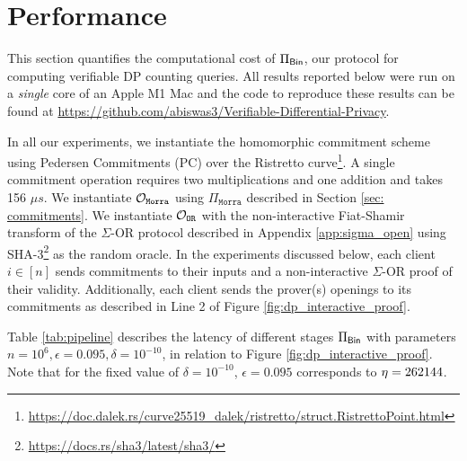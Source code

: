 \section{Performance}
\label{sec:expts}

This section quantifies the computational cost of $\Pi_{\mathsf{Bin}}$, our protocol for computing verifiable DP counting queries. 
All results reported below were run on a \textit{single} core of an Apple M1 Mac and the code to reproduce these results can be found at \url{https://github.com/abiswas3/Verifiable-Differential-Privacy}.\par
In all our experiments, we instantiate the homomorphic commitment scheme using Pedersen Commitments (PC) \cite{pedersen1991non} over the Ristretto curve\footnote{\url{https://doc.dalek.rs/curve25519_dalek/ristretto/struct.RistrettoPoint.html}}. 
A single commitment operation requires two multiplications and one addition and takes 156 $\mu s$. 
We instantiate $\mathcal{O}_{\texttt{Morra}}$ using $\Pi_{\texttt{Morra}}$ described in Section \ref{sec: commitments}.
We instantiate $\mathcal{O}_{\texttt{OR}}$ with the non-interactive Fiat-Shamir transform of the $\Sigma$-OR protocol described in Appendix \ref{app:sigma_open} using SHA-3\footnote{\url{https://docs.rs/sha3/latest/sha3/}} as the random oracle. 
In the experiments discussed below, each client $i \in [n]$ sends commitments to their inputs and a non-interactive $\Sigma$-OR proof of their 
validity.
Additionally, each client sends the prover(s) openings to its commitments as described in Line 2 of Figure \ref{fig:dp_interactive_proof}. \par
Table \ref{tab:pipeline} describes the latency of different stages $\Pi_{\mathsf{Bin}}$ with parameters $n=10^6, \epsilon=0.095, \delta= 10^{-10} $, in relation to Figure \ref{fig:dp_interactive_proof}. Note that for the fixed value of $\delta=10^{-10}$, $\epsilon=0.095$ corresponds to $\eta=262144$.

